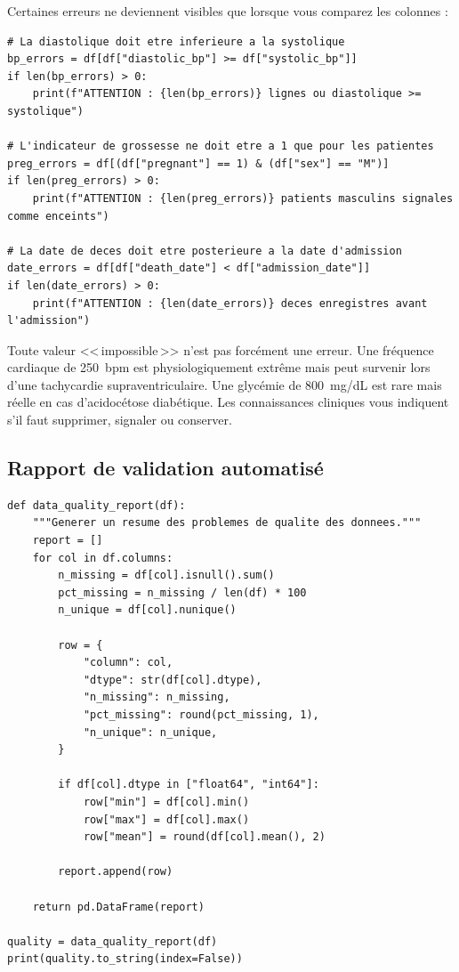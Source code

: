 Certaines erreurs ne deviennent visibles que lorsque vous comparez les colonnes :

\begin{verbatim}
# La diastolique doit etre inferieure a la systolique
bp_errors = df[df["diastolic_bp"] >= df["systolic_bp"]]
if len(bp_errors) > 0:
    print(f"ATTENTION : {len(bp_errors)} lignes ou diastolique >= systolique")

# L'indicateur de grossesse ne doit etre a 1 que pour les patientes
preg_errors = df[(df["pregnant"] == 1) & (df["sex"] == "M")]
if len(preg_errors) > 0:
    print(f"ATTENTION : {len(preg_errors)} patients masculins signales comme enceints")

# La date de deces doit etre posterieure a la date d'admission
date_errors = df[df["death_date"] < df["admission_date"]]
if len(date_errors) > 0:
    print(f"ATTENTION : {len(date_errors)} deces enregistres avant l'admission")
\end{verbatim}

\begin{clinicalnote}
Toute valeur <<\,impossible\,>> n'est pas forc\'ement une erreur. Une fr\'equence cardiaque de 250~bpm est physiologiquement extr\^eme mais peut survenir lors d'une tachycardie supraventriculaire. Une glyc\'emie de 800~mg/dL est rare mais r\'eelle en cas d'acidoc\'etose diab\'etique. Les connaissances cliniques vous indiquent s'il faut supprimer, signaler ou conserver.
\end{clinicalnote}

\subsection{Rapport de validation automatis\'e}

\begin{verbatim}
def data_quality_report(df):
    """Generer un resume des problemes de qualite des donnees."""
    report = []
    for col in df.columns:
        n_missing = df[col].isnull().sum()
        pct_missing = n_missing / len(df) * 100
        n_unique = df[col].nunique()

        row = {
            "column": col,
            "dtype": str(df[col].dtype),
            "n_missing": n_missing,
            "pct_missing": round(pct_missing, 1),
            "n_unique": n_unique,
        }

        if df[col].dtype in ["float64", "int64"]:
            row["min"] = df[col].min()
            row["max"] = df[col].max()
            row["mean"] = round(df[col].mean(), 2)

        report.append(row)

    return pd.DataFrame(report)

quality = data_quality_report(df)
print(quality.to_string(index=False))
\end{verbatim}

